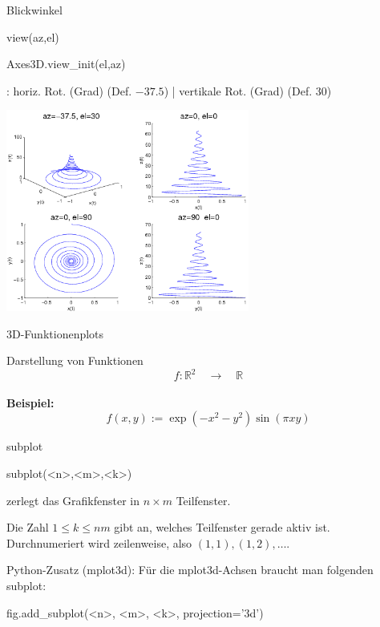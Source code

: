 \documentclass[hyperref={xetex}]{beamer}
\begin{document}
% 
% 
\begin{frame}[fragile]{Blickwinkel}
  \begin{matlabin}
view(az,el)
  \end{matlabin}
  \begin{pyin}
Axes3D.view_init(el,az)
  \end{pyin}
\alert{ }:  horiz. Rot. (Grad) (Def. \alert{  $-37.5$}) | \alert{ } vertikale Rot. (Grad) (Def. \alert{ $30$})
\begin{center}\includegraphics[width=0.6\textwidth]{figures/beispiel_plot3_2}\end{center}
\end{frame}
% 
% 
\begin{frame}[fragile]{3D-Funktionenplots}

Darstellung von Funktionen
\[ f: \mathbb{R}^2 \quad  \rightarrow \quad \mathbb{R} \]
\hspace*{1cm}\\

\textbf{Beispiel:}\\
\alert{ \[ f(x,y):=\exp(-x^2-y^2)\sin(\pi x y) \]}
\end{frame}
% 
% 
\begin{frame}[fragile]{subplot}
\begin{matlabin}
subplot(<n>,<m>,<k>)
\end{matlabin}
zerlegt das Grafikfenster in $n \times m$ Teilfenster. 

Die Zahl $1
\leq k \leq nm$ gibt an, welches Teilfenster gerade aktiv
ist. \\

Durchnumeriert wird zeilenweise, also $(1,1), (1,2), \dots$.

\alert{Python-Zusatz (mplot3d):} Für die mplot3d-Achsen braucht man folgenden subplot:
\begin{pyin}
fig.add_subplot(<n>, <m>, <k>, projection='3d')
\end{pyin}
\end{frame}
\end{document}
